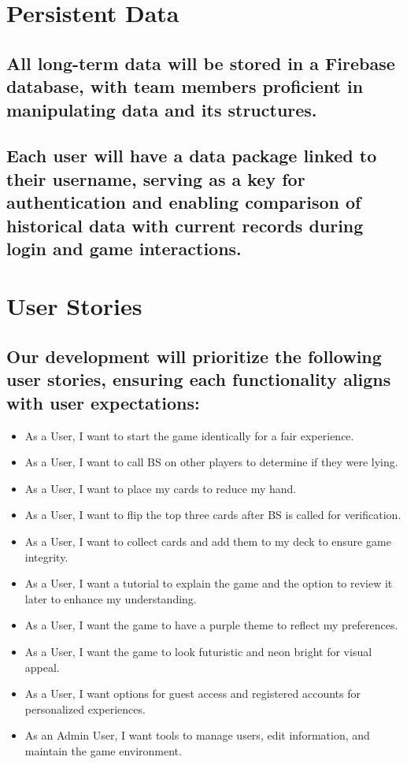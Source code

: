 \section{Persistent Data} \subsection{All long-term data will be stored in a Firebase database, with team members proficient in manipulating data and its structures.} \subsection{Each user will have a data package linked to their username, serving as a key for authentication and enabling comparison of historical data with current records during login and game interactions.}

\section{User Stories} \subsection{Our development will prioritize the following user stories, ensuring each functionality aligns with user expectations:}

\begin{itemize} \item As a User, I want to start the game identically for a fair experience. \item As a User, I want to call BS on other players to determine if they were lying. \item As a User, I want to place my cards to reduce my hand. \item As a User, I want to flip the top three cards after BS is called for verification. \item As a User, I want to collect cards and add them to my deck to ensure game integrity. \item As a User, I want a tutorial to explain the game and the option to review it later to enhance my understanding. \item As a User, I want the game to have a purple theme to reflect my preferences. \item As a User, I want the game to look futuristic and neon bright for visual appeal. \item As a User, I want options for guest access and registered accounts for personalized experiences. \item As an Admin User, I want tools to manage users, edit information, and maintain the game environment. \end{itemize}

